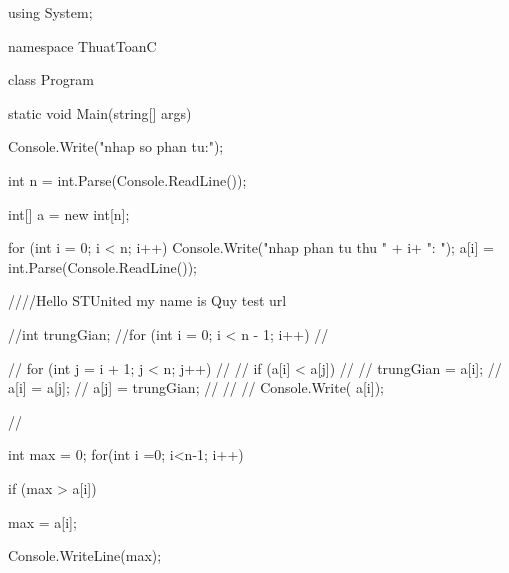 using System;

namespace ThuatToanC
{
    class Program
    {
        static void Main(string[] args)
        {
            Console.Write("nhap so phan tu:");

            int n = int.Parse(Console.ReadLine());

            int[] a = new int[n];


            for (int i = 0; i < n; i++)
            {
                Console.Write("nhap phan tu thu " + i+ ": ");
                a[i] = int.Parse(Console.ReadLine());
            }

             ////Hello STUnited my name is Quy  test url

            //int trungGian;
            //for (int i = 0; i < n - 1; i++)
            //{
            //    for (int j = i + 1; j < n; j++)
            //    {
            //        if (a[i] < a[j])
            //        {
            //            trungGian = a[i];
            //            a[i] = a[j];
            //            a[j] = trungGian;
            //        }
            //    }
            //    Console.Write( a[i]);

            //}

             int max = 0;
            for(int i =0; i<n-1; i++)
            {
               
                if (max > a[i])
                {
                    max = a[i];
                    
                }
                Console.WriteLine(max);
            }

        }
    }
}
